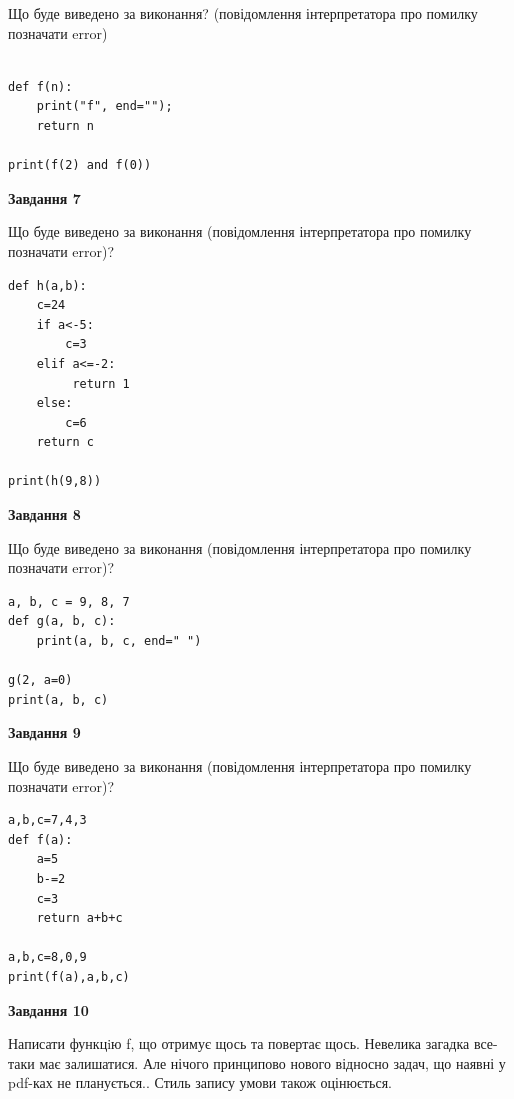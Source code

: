 \documentclass[12pt, ukrainian]{article}
\begin{document}
{\begin {large}
Що буде виведено за виконання? (повідомлення інтерпретатора про помилку позначати error)\par
\begin{verbatim}

def f(n):
    print("f", end="");
    return n

print(f(2) and f(0))
\end{verbatim}

{\begin {center}\textbf{Завдання 7}\end {center}}

Що буде виведено за виконання (повідомлення інтерпретатора про помилку позначати error)?\par
\begin{verbatim}
def h(a,b):
    c=24
    if a<-5:
        c=3
    elif a<=-2:
         return 1
    else: 
        c=6
    return c

print(h(9,8))
\end{verbatim}

{\begin {center}\textbf{Завдання 8}\end {center}}

Що буде виведено за виконання (повідомлення інтерпретатора про помилку позначати error)?\par
\begin{verbatim}
a, b, c = 9, 8, 7
def g(a, b, c):
    print(a, b, c, end=" ")

g(2, a=0)
print(a, b, c)
\end{verbatim}

{\begin {center}\textbf{Завдання 9}\end {center}}

Що буде виведено за виконання (повідомлення інтерпретатора про помилку позначати error)?\par
\begin{verbatim}
a,b,c=7,4,3
def f(a):
    a=5
    b-=2
    c=3
    return a+b+c

a,b,c=8,0,9
print(f(a),a,b,c)
\end{verbatim}

{\begin {center}\textbf{Завдання 10}\end {center}}


Написати функцiю f, що отримує щось та повертає щось. Невелика загадка все-таки має залишатися. Але нічого принципово нового відносно задач, що наявні у pdf-ках не планується.. Стиль запису умови також оцінюється.\par
\end {large}}
\newpage
\end{document}
